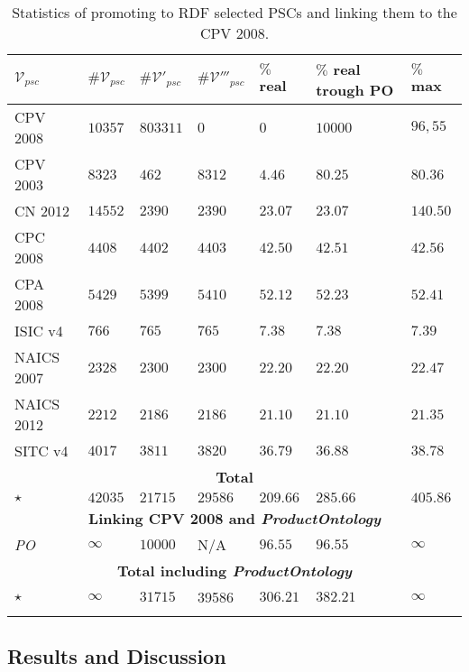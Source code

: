 \begin{longtable}[c]{|p{2.6cm}|p{1.8cm}|p{1.8cm}|p{1.8cm}|p{1.8cm}|p{1.8cm}|p{1.8cm}|} 
\hline
  $\mathcal{V}_{psc}$ & $\#\mathcal{V}_{psc}$  & $\#\mathcal{V'}_{psc}$ &$\#\mathcal{V'''}_{psc}$ &  $\%$ real &  $\%$ real trough PO  &  $\%$ max   \\\hline
\endhead
CPV 2008 	& $10357$  	& $803311$	& $0$	 	& $0$	 	& $10000$	& $96,55$  \\ \hline
CPV 2003 	& $8323$  	& $462$		& $8312$ 	& $4.46$ 	& $80.25$	& $80.36$  \\ \hline
CN 2012  	& $14552$	& $2390$	& $2390$ 	& $23.07$	& $23.07$	& $140.50$  \\ \hline
CPC 2008 	& $4408$	& $4402$   	& $4403$	& $42.50$	& $42.51$ 	& $42.56$  \\ \hline
CPA 2008 	& $5429$	& $5399$   	& $5410$	& $52.12$	& $52.23$	& $52.41$  \\ \hline
ISIC v4  	& $766$		& $765$   	& $765$ 	& $7.38$ 	& $7.38$	& $7.39$    \\ \hline
NAICS 2007 	& $2328$	& $2300$ 	& $2300$	& $22.20$	& $22.20$	& $22.47$  \\ \hline
NAICS 2012 	& $2212$	& $2186$ 	& $2186$	& $21.10$	& $21.10$	& $21.35$  \\ \hline
SITC v4 	& $4017$	& $3811$   	& $3820$	& $36.79$	& $36.88$	& $38.78$  \\ \hline
\multicolumn{7}{|c|}{\textbf{Total}} \\ \hline
$\star$ & $42035$ 		& $21715$   	& $29586$	& $209.66$ 	& $285.66$	& $405.86$ \\ \hline
\hline
\multicolumn{7}{|c|}{\textbf{Linking CPV 2008 and \textit{ProductOntology}}} \\ \hline
\textit{PO}& $\infty$	& $10000$   	& N/A	& $96.55$	& $96.55$ 	& $\infty$  \\ \hline
\multicolumn{7}{|c|}{\textbf{Total including \textit{ProductOntology}}} \\ \hline
$\star$	 & $\infty$	& $31715$   	& 39586	& $306.21$	& $382.21$	& $\infty$ \\ \hline
\hline
\caption{Statistics of promoting to RDF selected PSCs and linking them to the CPV 2008.}\label{ganancia-terminos}\\    
\end{longtable}

\subsection{Results and Discussion}



